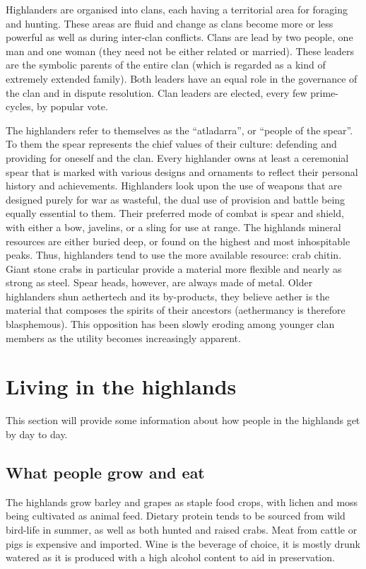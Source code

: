 \documentclass[a4paper,11pt,oneside]{book}
\begin{document}
Highlanders are organised into clans, each having a territorial area for foraging and hunting. These areas are fluid and change as clans become more or less powerful as well as during inter-clan conflicts. Clans are lead by two people, one man and one woman (they need not be either related or married). These leaders are the symbolic parents of the entire clan (which is regarded as a kind of extremely extended family). Both leaders have an equal role in the governance of the clan and in dispute resolution. Clan leaders are elected, every few prime-cycles, by popular vote.  

The highlanders refer to themselves as the ``atladarra'', or ``people of the spear''. To them the spear represents the chief values of their culture: defending and providing for oneself and the clan. Every highlander owns at least a ceremonial spear that is marked with various designs and ornaments to reflect their personal history and achievements. Highlanders look upon the use of weapons that are designed purely for war as wasteful, the dual use of provision and battle being equally essential to them. Their preferred mode of combat is spear and shield, with either a bow, javelins, or a sling for use at range. The highlands mineral resources are either buried deep, or found on the highest and most inhospitable peaks. Thus, highlanders tend to use the more available resource: crab chitin. Giant stone crabs in particular provide a material more flexible and nearly as strong as steel. Spear heads, however, are always made of metal. Older highlanders shun aethertech and its by-products, they believe aether is the material that composes the spirits of their ancestors (aethermancy is therefore blasphemous). This opposition has been slowly eroding among younger clan members as the utility becomes increasingly apparent.  



\section{Living in the highlands}
This section will provide some information about how people in the highlands get by day to day.

\subsection{What people grow and eat}
The highlands grow barley and grapes as staple food crops, with lichen and moss being cultivated as animal feed. Dietary protein tends to be sourced from wild bird-life in summer, as well as both hunted and raised crabs. Meat from cattle or pigs is expensive and imported. Wine is the beverage of choice, it is mostly drunk watered as it is produced with a high alcohol content to aid in preservation. 
\end{document}
